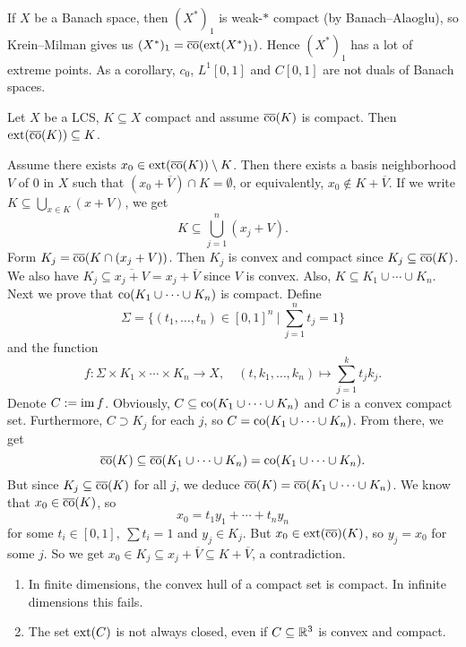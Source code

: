 \begin{example}
  If $X$ be a Banach space, then $(X^*)_1$ is weak-$*$ compact (by Banach--Alaoglu),
  so Krein--Milman gives us $(X^*)_1 = \overline{\operatorname{co}} (\operatorname{ext} (X^*)_1)$. Hence $(X^*)_1$ has a lot of extreme points.
  As a corollary, $c_0$, $L^1 [0, 1]$ and $C[0, 1]$ are not duals of Banach spaces.
\end{example}

\begin{theorem}[Milman]
  Let $X$ be a LCS, $K \subseteq X$ compact and assume $\overline{\operatorname{co}} (K)$ is compact.
  Then $\operatorname{ext} (\overline{\operatorname{co}} (K)) \subseteq K$.
\end{theorem}

\begin{myproof}
  Assume there exists $x_0 \in \operatorname{ext} (\overline{\operatorname{co}} (K)) \setminus K$.
  Then there exists a basis neighborhood $V$ of $0$ in $X$ such that 
  $(x_0 + \overline{V}) \cap K = \emptyset$, or equivalently, $x_0 \notin K + \overline{V}$.
  If we write 
  $K \subseteq \bigcup_{x \in K} (x + V)$, 
  we get 
  $$K \subseteq \bigcup_{j = 1} ^{n} (x_j + V).$$
  Form $K_j = \overline{\operatorname{co}} (K \cap (x_j + V))$.
  Then $K_j$ is convex and compact since $K_j \subseteq \overline{\operatorname{co}} (K)$.
  We also have $K_j \subseteq \overline{x_j + V} = x_j + \overline{V}$ since $V$ is convex.
  Also, $K \subseteq K_1 \cup \cdots \cup K_n$.
  Next we prove that $\operatorname{co} (K_1 \cup \cdots \cup K_n)$ is compact.
  Define $$\Sigma = \{(t_1, \dots, t_n) \in [0, 1]^n\ |\ \sum_{j = 1} ^n t_j = 1\}$$
  and the function 
  $$f: \Sigma \times K_1 \times \cdots \times K_n \to X,\quad (t, k_1, \dots, k_n) \mapsto \sum_{j = 1} ^k t_j k_j.$$
  Denote $C := \operatorname{im} f$.
  Obviously, $C \subseteq \operatorname{co} (K_1 \cup \cdots \cup K_n)$ and $C$ is a convex compact set.
  Furthermore, $C \supset K_j$ for each $j$, so $C = \operatorname{co} (K_1 \cup \cdots \cup K_n)$.
  From there, we get 
  $$\overline{\operatorname{co}} (K) \subseteq \overline{\operatorname{co}} (K_1 \cup \cdots \cup K_n) = {\operatorname{co}} (K_1 \cup \cdots \cup K_n).$$
  But since $K_j \subseteq \overline{\operatorname{co}} (K)$ for all $j$, we deduce $\overline{\operatorname{co}} (K) = \overline{\operatorname{co}} (K_1 \cup \cdots \cup K_n)$.
  We know that $x_0 \in \overline{\operatorname{co}} (K)$, so $$x_0 = t_1 y_1 + \cdots + t_n y_n$$
  for some $t_i \in [0, 1],\ \sum t_i = 1$ and $y_j \in K_j$.
  But $x_0 \in \operatorname{ext} (\overline{\operatorname{co}})(K)$, so $y_j = x_0$ for some $j$. So we get 
  $x_0 \in K_j \subseteq x_j + \overline{V} \subseteq K + \overline{V}$,
  a contradiction.
\end{myproof}

\begin{remark}
  \begin{enumerate}
    \item In finite dimensions, the convex hull of a compact set is compact.
    In infinite dimensions this fails.
    \item The set $\operatorname{ext} (C)$ is not always closed, even if $C \subseteq \mathbb {R}^3$ is convex and compact. 
  \end{enumerate}
\end{remark}